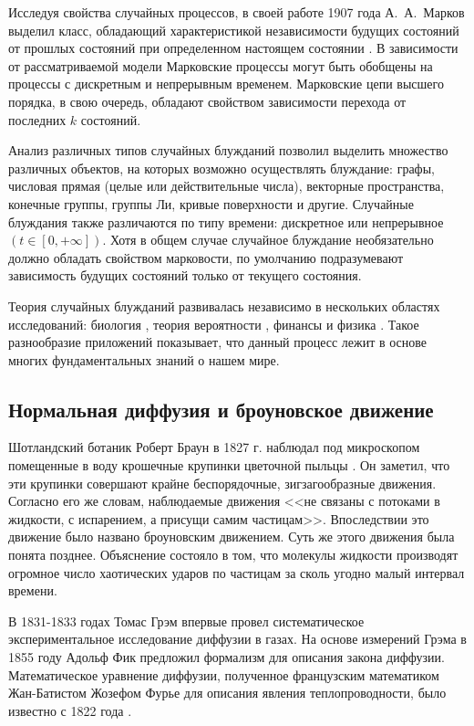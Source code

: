 Исследуя свойства случайных процессов, в своей работе 1907 года А.~А.~Марков выделил класс, обладающий характеристикой независимости будущих состояний от прошлых состояний при определенном настоящем состоянии \cite{shiryaev_2021}. В зависимости от рассматриваемой модели Марковские процессы могут быть обобщены на процессы с дискретным и непрерывным временем. Марковские цепи высшего порядка, в свою очередь, обладают свойством зависимости перехода от последних $k$ состояний.

Анализ различных типов случайных блужданий позволил выделить множество различных объектов, на которых возможно осуществлять блуждание: графы, числовая прямая (целые или действительные числа), векторные пространства, конечные группы, группы Ли, кривые поверхности и другие. Случайные блуждания также различаются по типу времени: дискретное или непрерывное $(t \in [0, +\infty])$. Хотя в общем случае случайное блуждание необязательно должно обладать свойством марковости, по умолчанию подразумевают зависимость будущих состояний только от текущего состояния.

Теория случайных блужданий развивалась независимо в нескольких областях исследований: биология \cite{chowdhury_100_2005}, теория вероятности \cite{strecker_alexandr_2011}, финансы \cite{bachelier_theorie_1900} и физика \cite{pearson_problem_1905,rayleigh_problem_1905}. Такое разнообразие приложений показывает, что данный процесс лежит в основе многих фундаментальных знаний о нашем мире.

\subsection{Нормальная диффузия и броуновское движение}\label{subsec:ch1/sec2/sub1}

Шотландский ботаник Роберт Браун в 1827 г. наблюдал под микроскопом помещенные в воду крошечные крупинки цветочной пыльцы \cite{brown_brief_2015}. Он заметил, что эти крупинки совершают крайне беспорядочные, зигзагообразные движения. Согласно его же словам, наблюдаемые движения <<не связаны с потоками в жидкости, с испарением, а присущи самим частицам>>. Впоследствии это движение было названо броуновским движением. Суть же этого движения была понята позднее. Объяснение состояло в том, что молекулы жидкости производят огромное число хаотических ударов по частицам за сколь угодно малый интервал времени.

В 1831-1833 годах Томас Грэм впервые провел систематическое экспериментальное исследование диффузии в газах. На основе измерений Грэма в 1855 году Адольф Фик предложил формализм для описания закона диффузии. Математическое уравнение диффузии, полученное французским математиком Жан-Батистом Жозефом Фурье для описания явления теплопроводности, было известно с 1822 года \cite{fourier_theorie_1822}. 

